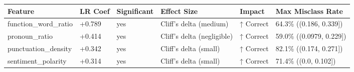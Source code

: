 \begin{tabular}{llllll}
\toprule
Feature & LR Coef & Significant & Effect Size & Impact & Max Misclass Rate \\
\midrule
function\_word\_ratio & +0.789 & yes & Cliff's delta (medium) & ↑ Correct & 64.3\% ((0.186, 0.339]) \\
pronoun\_ratio & +0.414 & yes & Cliff's delta (negligible) & ↑ Correct & 59.0\% ((0.0979, 0.229]) \\
punctuation\_density & +0.342 & yes & Cliff's delta (small) & ↑ Correct & 82.1\% ((0.174, 0.271]) \\
sentiment\_polarity & +0.314 & yes & Cliff's delta (small) & ↑ Correct & 71.4\% ((0.0, 0.102]) \\
\bottomrule
\end{tabular}
